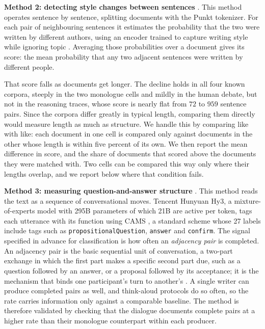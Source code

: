 \documentclass[10pt,twocolumn]{article}
\begin{document}
\textbf{Method 2: detecting style changes between sentences} \cite{schmidt2025}. This method
operates sentence by sentence, splitting documents with the Punkt tokenizer. For each pair of
neighbouring sentences it estimates the probability that the two were written by different authors,
using an encoder trained to capture writing style while ignoring topic \cite{patel2025}. Averaging
those probabilities over a document gives its score: the mean probability that any two adjacent
sentences were written by different people.

That score falls as documents get longer. The decline holds in all four known corpora, steeply in the
two monologue cells and mildly in the human debate, but not in the reasoning traces, whose score is
nearly flat from $72$ to $959$ sentence pairs. Since the corpora differ greatly in typical length,
comparing them directly would measure length as much as structure. We handle this by comparing like
with like: each document in one cell is compared only against documents in the other whose length is
within five percent of its own. We then report the mean difference in score, and the share of
documents that scored above the documents they were matched with. Two cells can be compared this way
only where their lengths overlap, and we report below where that condition fails.

\textbf{Method 3: measuring question-and-answer structure} \cite{schegloff1973}. This method reads
the text as a sequence of conversational moves. Tencent Hunyuan Hy3, a mixture-of-experts model with
295B parameters of which 21B are active per token, tags each utterance with its function using CAMS
\cite{duran2022}, a standard scheme whose 27 labels include tags such as
\texttt{propositionalQuestion}, \texttt{answer} and \texttt{confirm}. The signal specified in advance
for classification is how often an \emph{adjacency pair} is completed. An adjacency pair is the basic
sequential unit of conversation, a two-part exchange in which the first part makes a specific second
part due, such as a question followed by an answer, or a proposal followed by its acceptance; it is
the mechanism that binds one participant's turn to another's \cite{schegloff1973}. A single writer can produce completed pairs as well, and think-aloud
protocols do so often, so the rate carries information only against a comparable baseline. The method
is therefore validated by checking that the dialogue documents complete pairs at a higher rate than
their monologue counterpart within each producer.
\end{document}
